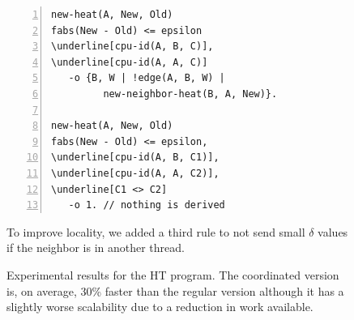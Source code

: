 \begin{figure}[h!]
\scriptsize\begin{Verbatim}[numbers=left,commandchars=\\\[\]]
new-heat(A, New, Old)
fabs(New - Old) <= epsilon
\underline[cpu-id(A, B, C)],
\underline[cpu-id(A, A, C)]
   -o {B, W | !edge(A, B, W) |
         new-neighbor-heat(B, A, New)}.

new-heat(A, New, Old)
fabs(New - Old) <= epsilon,
\underline[cpu-id(A, B, C1)],
\underline[cpu-id(A, A, C2)],
\underline[C1 <> C2]
   -o 1. // nothing is derived
\end{Verbatim}
  \caption{To improve locality, we added a third rule to not send small $\delta$
     values if the neighbor is in another thread.}
  \label{code:ht_better}
\end{figure}
\normalsize

\begin{figure}[ht!]
   \begin{center}
   \end{center}
   \caption{Experimental results for the HT program. The coordinated version
      is, on average, 30\% faster than the regular version although it has a
      slightly worse scalability due to a reduction in work available.}
   \label{results:ht}
\end{figure}
